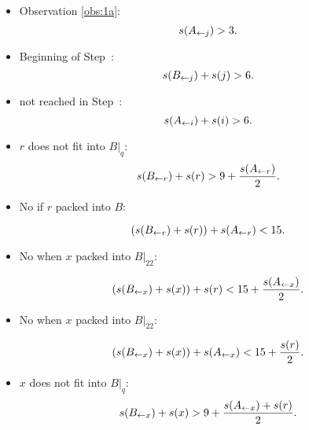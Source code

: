 \begin{itemize}
\item Observation \ref{obs:1a}:
\begin{equation}\label{eq:0}
s(A_{\leftarrow j}) > 3.
\end{equation}

\item Beginning of Step~:
\begin{equation}\label{eq:1}
s(B_{\leftarrow j}) + s(j) > 6.
\end{equation}

\item {} not reached in Step~:
\begin{equation}\label{eq:2}
s(A_{\leftarrow i}) + s(i) > 6.
\end{equation}

\item $r$ does not fit into $B|_q$:
\begin{equation}\label{eq:3}
s(B_{\leftarrow r})+ s(r) > 9 + \frac{s(A_{\leftarrow r})}{2}.
\end{equation}

\item No  if $r$ packed into $B$:

\begin{equation}\label{eq:4}
\left(s(B_{\leftarrow r}) + s(r) \right) + s(A_{\leftarrow r}) < 15.
\end{equation}

\item No  when $x$ packed into $B|_{22}$:

\begin{equation}\label{eq:5}
\left(s(B_{\leftarrow x}) + s(x) \right) + s(r) < 15 + \frac{s(A_{\leftarrow x})}{2}. 
\end{equation}

\item No  when $x$ packed into $B|_{22}$:

\begin{equation}\label{eq:6}
\left(s(B_{\leftarrow x})+ s(x) \right) + s(A_{\leftarrow x}) < 15 + \frac{s(r)}{2}. 
\end{equation}

\item $x$ does not fit into $B|_{q}$:
\begin{equation}\label{eq:7}
s(B_{\leftarrow x}) + s(x) > 9 + \frac{s(A_{\leftarrow x}) + s(r)}{2}.
\end{equation}


\end{itemize}
